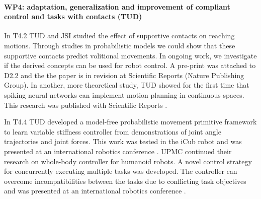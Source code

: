 

\paragraph*{WP4: adaptation, generalization and improvement of compliant control and tasks with contacts (TUD)}


In T4.2 TUD and JSI studied the effect of supportive contacts on reaching 
motions. Through studies in probabilistic models we could show that these 
supportive contacts predict volitional movements. In ongoing work, we 
investigate if the derived concepts can be used for robot control. A pre-print 
was attached to D2.2 and the the paper is in revision at Scientific Reports 
(Nature Publishing Group). In another, more theoretical study, TUD showed for 
the first time that spiking neural networks can implement motion planning in 
continuous spaces. This research was published with Scientific Reports 
\cite{Rueckert_SR_2016}. 

In T4.4 TUD developed a model-free probabilistic movement primitive framework to 
learn variable stiffness controller from demonstrations of joint angle 
trajectories and joint forces. This work was tested in the iCub robot and was 
presented at an international robotics conference \cite{paraschos2015model}. 
UPMC continued their research on whole-body controller for humanoid robots. A 
novel control strategy for concurrently executing multiple tasks was developed. 
The controller can overcome incompatibilities between the tasks due to 
conflicting task objectives and was presented at an international robotics 
conference \cite{lober2015variance}.  
